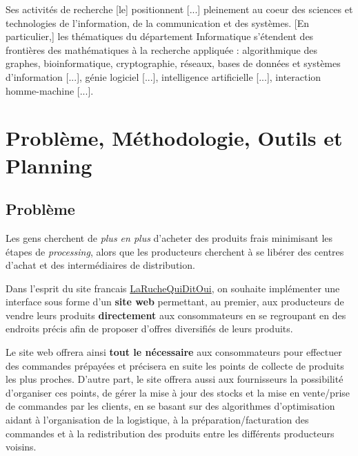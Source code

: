 \documentclass[a4paper,12pt]{book}
\theoremstyle{break}
\theoremstyle{break}
\theoremstyle{break}
\theoremstyle{break}
\theoremstyle{definition}
\theoremstyle{remark}
\begin{document}
Ses activités de recherche [le] positionnent [...] pleinement au coeur des sciences et technologies de l’information, de la communication et des systèmes. [En particulier,] les thématiques du département Informatique s’étendent des frontières des mathématiques à la recherche appliquée : algorithmique des graphes, bioinformatique, cryptographie, réseaux, bases de données et systèmes d'information [...], génie logiciel [...], intelligence artificielle [...], interaction homme-machine [...]. \fg{} \citep{lirmmPres}

\chapter{Problème, Méthodologie, Outils et Planning}
\section{Problème}
Les gens cherchent de \textit{plus en plus} d'acheter des produits frais minimisant les étapes de \textit{processing}, alors que les producteurs cherchent à se libérer des centres d’achat et des intermédiaires de distribution.

Dans l’esprit du site francais \href{https://laruchequiditoui.fr/fr}{LaRucheQuiDitOui}, on souhaite implémenter une interface sous forme d'un \textbf{site web} permettant, au premier, aux producteurs de vendre leurs produits \textbf{directement} aux consommateurs en se regroupant en des endroits précis afin de proposer d'offres diversifiés de leurs produits.

Le site web offrera ainsi \textbf{tout le nécessaire} aux consommateurs pour effectuer des commandes prépayées et précisera en suite les points de collecte de produits les plus proches. D'autre part, le site offrera aussi aux fournisseurs la possibilité d'organiser ces points, de gérer la mise à jour des
stocks et la mise en vente/prise de commandes par les clients, en se basant sur des algorithmes d'optimisation aidant à l'organisation de la logistique, à la préparation/facturation des commandes et à la redistribution des produits entre les différents producteurs voisins.
\end{document}
